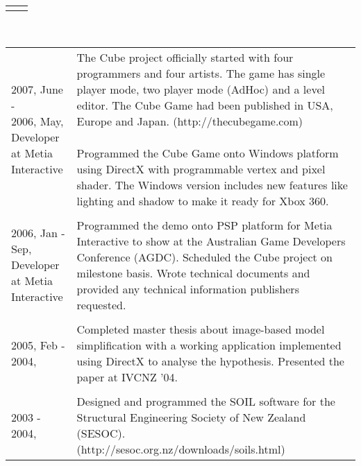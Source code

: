 \begin{resume}
\begin{tabular}{ll}
{}\end{tabular}\\
\begin{tabular}{ll}
\parbox[t]{30mm}{2007, June - \\ 2006, May,\\Developer\\at Metia Interactive} & \parbox[t]{116mm}{

The Cube project officially started with four programmers and four artists. The game has single player mode, two player mode (AdHoc) and a level editor. The Cube Game had been published in USA, Europe and Japan. (http://thecubegame.com)
\\\\
Programmed the Cube Game onto Windows platform using DirectX with programmable vertex and pixel shader. The Windows version includes new features like lighting and shadow to make it ready for Xbox 360.

}\\\\
\parbox[t]{30mm}{2006, Jan - Sep,\\Developer\\at Metia Interactive} & \parbox[t]{116mm}{

Programmed the demo onto PSP platform for Metia Interactive to show at the Australian Game Developers Conference (AGDC). Scheduled the Cube project on milestone basis. Wrote technical documents and provided any technical information publishers requested.

}\\\\
\parbox[t]{30mm}{2005, Feb - \\ 2004,} & \parbox[t]{116mm}{

Completed master thesis about image-based model simplification with a working application implemented using DirectX to analyse the hypothesis. Presented the paper at IVCNZ '04.

}\\\\
\parbox[t]{30mm}{2003 - 2004,} & \parbox[t]{116mm}{

Designed and programmed the SOIL software for the Structural Engineering Society of New Zealand (SESOC).\\(http://sesoc.org.nz/downloads/soils.html)

}\end{tabular} 

\vspace{0.15in} 


\end{resume}
